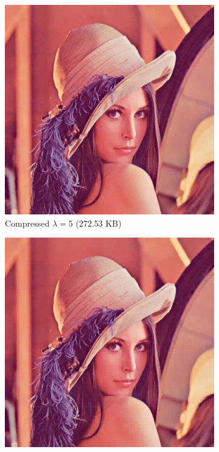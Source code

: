 \documentclass[12pt]{article}
\theoremstyle{definition}
\begin{document}
\begin{figure}
\begin{subfigure}[t]{.49\linewidth}
      \includegraphics[width=.93\linewidth]{figs/lena_haar_5.png}
      \caption{Compressed \(\lambda = 5\) (272.53 KB)}
    \end{subfigure}
    \begin{subfigure}[t]{.49\linewidth}
      \centering
      \includegraphics[width=.93\linewidth]{figs/lena_haar_10.png}

\end{subfigure}
\end{figure}
\end{document}
